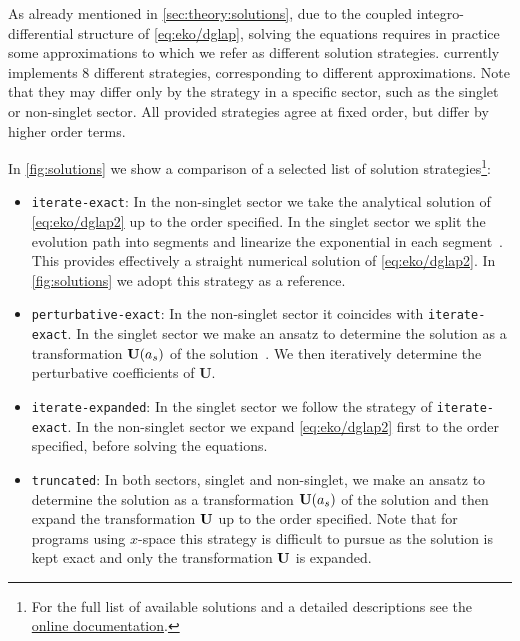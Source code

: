 As already mentioned in \cref{sec:theory:solutions}, due to
the coupled integro-differential structure of \cref{eq:eko/dglap}, 
solving the equations requires in practice some approximations to which we refer as different
solution strategies. \eko{} currently implements 8 different strategies,
corresponding to different approximations.
Note that they may differ only by the strategy in a specific sector,
such as the singlet or non-singlet sector. All provided strategies
agree at fixed order, but differ by higher order terms.

In \cref{fig:solutions} we show a comparison of a selected list of
solution strategies\footnote{For the full list of available solutions and a
detailed descriptions see the
\href{https://eko.readthedocs.io/en/latest}{online documentation}.}:

\begin{itemize}
    \item \texttt{iterate-exact}:
        In the non-singlet sector we take the analytical solution
        of \cref{eq:eko/dglap2} up to the order specified.
        In the singlet sector we split the evolution path into segments
        and linearize the exponential in each segment~\cite{Bonvini:2012sh}.
        This provides effectively a straight numerical solution of \cref{eq:eko/dglap2}.
        In \cref{fig:solutions} we adopt this strategy as a reference.
    \item \texttt{perturbative-exact}:
        In the non-singlet sector it coincides with \texttt{iterate-exact}.
        In the singlet sector we make an ansatz to determine the solution as a
        transformation $\vb{U}(a_s)$ of the \lo{} solution~\cite{Vogt:2004ns}. We then
        iteratively determine the perturbative coefficients of $\textbf{U}$.
    \item \texttt{iterate-expanded}:
        In the singlet sector we follow the strategy of \texttt{iterate-exact}.
        In the non-singlet sector we expand \cref{eq:eko/dglap2} first to the order
        specified, before solving the equations.
    \item \texttt{truncated}: 
        In both sectors, singlet and non-singlet, we make an ansatz to determine the solution as a
        transformation $\vb{U}(a_s)$ of the \lo{} solution and
        then expand the transformation $\vb U$ up to the order specified.
        Note that for programs using $x$-space this strategy is difficult
        to pursue as the \lo{} solution is kept exact and only the transformation
        $\vb U$ is expanded.
\end{itemize}


